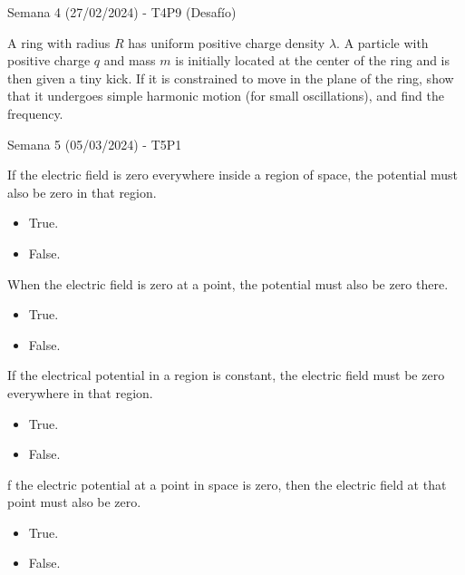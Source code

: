 \begin{frame}{Semana 4 (27/02/2024) - T4P9 (Desafío)}
  
  A ring with radius $R$ has uniform positive charge density $\lambda$. A particle with positive charge $q$ and mass $m$ is initially located at the center of the ring and is then given a tiny kick. If it is constrained to move in the plane of the ring, show that it undergoes simple harmonic motion (for small oscillations), and find the frequency.
    
\end{frame}

\begin{frame}{Semana 5 (05/03/2024) - T5P1}
    
    If the electric field is zero everywhere inside a region of space, the potential must also be zero in that region.
    
    \begin{itemize}
        \item[A)] True.
        \item[B)] False.
    \end{itemize}
    
    
    When the electric field is zero at a point, the potential must also be zero there.
    
    \begin{itemize}
        \item[A)] True.
        \item[B)] False.
    \end{itemize}
    
    If the electrical potential in a region is constant, the electric field must be zero everywhere in that region.
    
    \begin{itemize}
        \item[A)] True.
        \item[B)] False.
    \end{itemize}
    
    f the electric potential at a point in space is zero, then the electric field at that point must also be zero.
    
    \begin{itemize}
        \item[A)] True.
        \item[B)] False.
    \end{itemize}
    
\end{frame}

